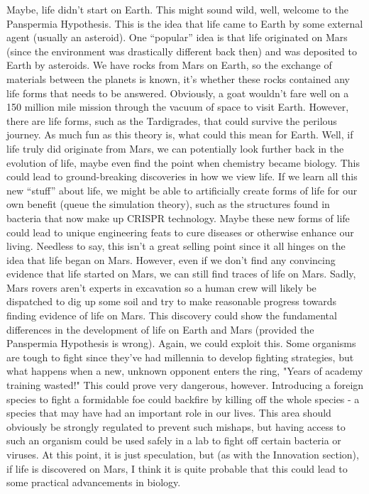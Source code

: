 \documentclass[main.tex]{subfiles}
\begin{document}
Maybe, life didn't start on Earth. This might sound wild, well, welcome to the Panspermia Hypothesis. This is the idea that life came to Earth by some external agent (usually an asteroid). One “popular” idea is that life originated on Mars (since the environment was drastically different back then) and was deposited to Earth by asteroids. We have rocks from Mars on Earth, so the exchange of materials between the planets is known, it's whether these rocks contained any life forms that needs to be answered. Obviously, a goat wouldn't fare well on a 150 million mile mission through the vacuum of space to visit Earth. However, there are life forms, such as the Tardigrades, that could survive the perilous journey. As much fun as this theory is, what could this mean for Earth. Well, if life truly did originate from Mars, we can potentially look further back in the evolution of life, maybe even find the point when chemistry became biology. This could lead to ground-breaking discoveries in how we view life. If we learn all this new “stuff” about life, we might be able to artificially create forms of life for our own benefit (queue the simulation theory), such as the structures found in bacteria that now make up CRISPR technology. Maybe these new forms of life could lead to unique engineering feats to cure diseases or otherwise enhance our living. Needless to say, this isn't a great selling point since it all hinges on the idea that life began on Mars. However, even if we don't find any convincing evidence that life started on Mars, we can still find traces of life on Mars. Sadly, Mars rovers aren't experts in excavation so a human crew will likely be dispatched to dig up some soil and try to make reasonable progress towards finding evidence of life on Mars. This discovery could show the fundamental differences in the development of life on Earth and Mars (provided the Panspermia Hypothesis is wrong). Again, we could exploit this. Some organisms are tough to fight since they've had millennia to develop fighting strategies, but what happens when a new, unknown opponent enters the ring, "Years of academy training wasted!" This could prove very dangerous, however. Introducing a foreign species to fight a formidable foe could backfire by killing off the whole species - a species that may have had an important role in our lives. This area should obviously be strongly regulated to prevent such mishaps, but having access to such an organism could be used safely in a lab to fight off certain bacteria or viruses. At this point, it is just speculation, but (as with the Innovation section), if life is discovered on Mars, I think it is quite probable that this could lead to some practical advancements in biology. 
\end{document}
